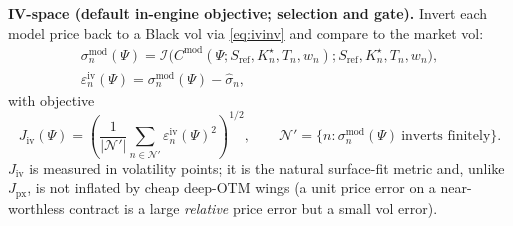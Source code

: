 \documentclass[a4paper, 11pt, reqno]{amsart}
\begin{document}
			\textbf{IV-space (default in-engine objective; selection and gate).} Invert each model price back to a Black vol via
			\eqref{eq:ivinv} and compare to the market vol:
			\begin{equation}\label{eq:resid-iv}
			\begin{gathered}
				\sigma^{\mathrm{mod}}_n(\Psi) = \mathcal{I}\bigl( C^{\mathrm{mod}}(\Psi; S_{\mathrm{ref}}, K^\star_n, T_n, w_n);
				    S_{\mathrm{ref}}, K^\star_n, T_n, w_n \bigr), \\
				\varepsilon^{\mathrm{iv}}_n(\Psi) = \sigma^{\mathrm{mod}}_n(\Psi) - \hat\sigma_n,
			\end{gathered}
			\end{equation}
			with objective
			\begin{equation}\label{eq:obj-iv}
				J_{\mathrm{iv}}(\Psi)
				= \left( \frac{1}{|\mathcal{N}'|} \sum_{n\in\mathcal{N}'} \varepsilon^{\mathrm{iv}}_n(\Psi)^2 \right)^{1/2},
				\qquad \mathcal{N}' = \{ n : \sigma^{\mathrm{mod}}_n(\Psi)\ \text{inverts finitely} \}.
			\end{equation}
			$J_{\mathrm{iv}}$ is measured in volatility points; it is the natural surface-fit metric and,
			unlike $J_{\mathrm{px}}$, is not inflated by cheap deep-OTM wings (a unit price error on a
			near-worthless contract is a large \emph{relative} price error but a small vol error).
	
\end{document}
